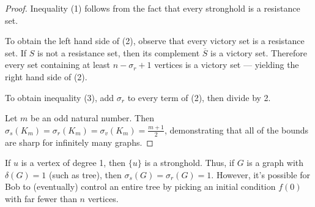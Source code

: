 \documentclass{article}
\newcommand{\ol}[1]{\overline{#1}}
\theoremstyle{plain}
\theoremstyle{definition}
\begin{document}
\begin{proof}
	Inequality (1) follows from the fact that every stronghold is a resistance set.
	
	To obtain the left hand side of (2), observe that every victory set is a resistance set. 
	If $S$ is not a resistance set, then its complement $\ol{S}$ is a victory set. Therefore every set containing at least $n-\sigma_r + 1$ vertices is a victory set --- yielding the right hand side of (2).
	
	To obtain inequality (3), add $\sigma_r$ to every term of (2), then divide by 2.
	
	Let $m$ be an odd natural number. Then $\sigma_s(K_m) = \sigma_r(K_m) = \sigma_v(K_m) = \frac{m+1}{2}$, demonstrating that all of the bounds are sharp for infinitely many graphs.
\end{proof}

If $u$ is a vertex of degree 1, then $\{u\}$ is a stronghold. Thus, if $G$ is a graph with $\delta(G) = 1$ (such as tree), then $\sigma_s(G) = \sigma_r(G) = 1$. However, it's possible for Bob to (eventually) control an entire tree by picking an initial condition $f(0)$ with far fewer than $n$ vertices.




\end{document}
